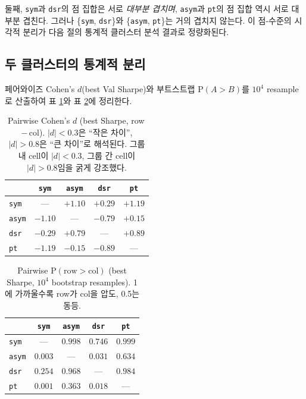 \documentclass[11pt, a4paper]{article}
\begin{document}
둘째, \texttt{sym}과 \texttt{dsr}의 점 집합은 서로 \emph{대부분 겹치며}, \texttt{asym}과
\texttt{pt}의 점 집합 역시 서로 대부분 겹친다. 그러나 \{\texttt{sym}, \texttt{dsr}\}와
\{\texttt{asym}, \texttt{pt}\}는 거의 겹치지 않는다. 이 점-수준의 시각적 분리가
다음 절의 통계적 클러스터 분석 결과로 정량화된다.

\subsection{두 클러스터의 통계적 분리}
\label{sec:pareto_clusters}

페어와이즈 Cohen's $d$(best Val Sharpe)와 부트스트랩 $\mathrm{P}(A > B)$를
$10^4$ resample로 산출하여 표 \ref{tab:pareto_cohens_d}와 표
\ref{tab:pareto_p_a_gt_b}에 정리한다.

\begin{table}[!htbp]
\centering
\caption{Pairwise Cohen's $d$ (best Sharpe, row\,$-$\,col). $|d| < 0.3$은 ``작은
차이'', $|d| > 0.8$은 ``큰 차이''로 해석된다. 그룹 내 cell이 $|d| < 0.3$, 그룹 간
cell이 $|d| > 0.8$임을 굵게 강조했다.}
\begin{tabular}{lcccc}
\toprule
 & \texttt{sym} & \texttt{asym} & \texttt{dsr} & \texttt{pt} \\
\midrule
\texttt{sym}  & ---   & $+\mathbf{1.10}$ & $+0.29$ & $+\mathbf{1.19}$ \\
\texttt{asym} & $-\mathbf{1.10}$ & ---   & $-0.79$ & $+0.15$ \\
\texttt{dsr}  & $-0.29$ & $+0.79$ & ---   & $+\mathbf{0.89}$ \\
\texttt{pt}   & $-\mathbf{1.19}$ & $-0.15$ & $-\mathbf{0.89}$ & ---   \\
\bottomrule
\end{tabular}
\label{tab:pareto_cohens_d}
\end{table}

\begin{table}[!htbp]
\centering
\caption{Pairwise $\mathrm{P}(\text{row} > \text{col})$ (best Sharpe,
$10^4$ bootstrap resamples). 1에 가까울수록 row가 col을 압도, 0.5는 동등.}
\begin{tabular}{lcccc}
\toprule
 & \texttt{sym} & \texttt{asym} & \texttt{dsr} & \texttt{pt} \\
\midrule
\texttt{sym}  & ---   & $0.998$ & $0.746$ & $0.999$ \\
\texttt{asym} & $0.003$ & ---   & $0.031$ & $0.634$ \\
\texttt{dsr}  & $0.254$ & $0.968$ & ---   & $0.984$ \\
\texttt{pt}   & $0.001$ & $0.363$ & $0.018$ & ---   \\
\bottomrule
\end{tabular}
\label{tab:pareto_p_a_gt_b}
\end{table}
\end{document}
